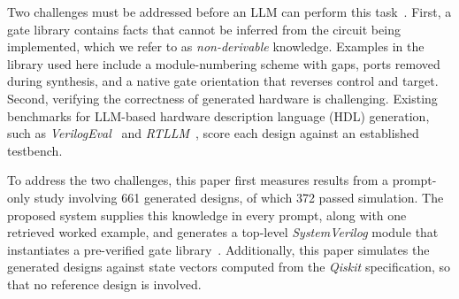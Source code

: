 \documentclass[conference]{IEEEtran}
\begin{document}
Two challenges must be addressed before an LLM can perform this task~\cite{tran2025qea,gu2025precision,podobas2023q2logic}.
First, a gate library contains facts that cannot be inferred from the
circuit being implemented, which we refer to as \emph{non-derivable}
knowledge. Examples in the library used here include a module-numbering
scheme with gaps, ports removed during synthesis, and a native gate
orientation that reverses control and target. Second, verifying the correctness of
generated hardware is challenging. Existing benchmarks for
LLM-based hardware description language (HDL) generation, such as
\textit{VerilogEval}~\cite{verilogeval2023} and \textit{RTLLM}~\cite{rtllm2024}, score each design against an established testbench.

To address the two challenges, this paper first measures results from a prompt-only study involving 661 generated designs, of which 372 passed simulation. The proposed system supplies this knowledge in every prompt, along with one retrieved worked example, and generates a top-level \textit{SystemVerilog} module that instantiates a pre-verified gate library~\cite{isqed2026,hpdc26}. Additionally, this paper simulates the generated designs against state vectors computed from the \textit{Qiskit} specification, so that no reference design is involved.

\end{document}

